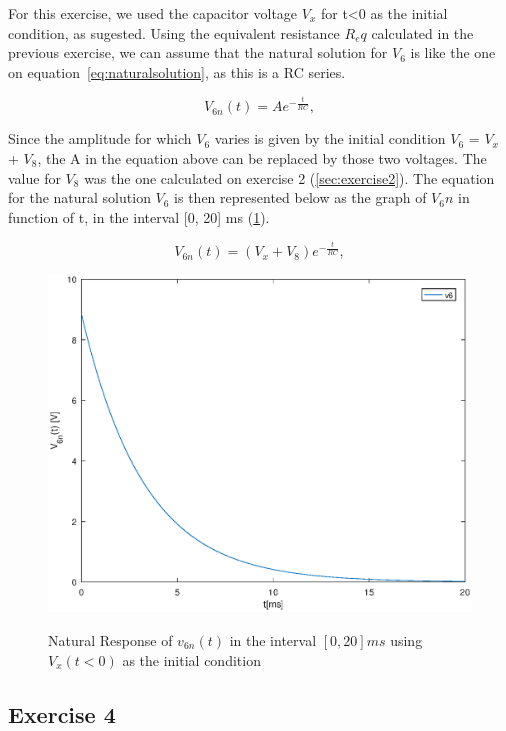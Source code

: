 For this exercise, we used the capacitor voltage $V_x$ for t<0 as the initial condition, as sugested. Using the equivalent resistance $R_eq$ calculated in the previous exercise, we can assume that the natural solution for $V_6$ is like the one on equation~\ref{eq:naturalsolution}, as this is a RC series.

\begin{equation}
  V_{6n}(t) = Ae^{-\frac{t}{RC}},
  \label{eq:naturalsolution}
\end{equation}

Since the amplitude for which $V_6$ varies is given by the initial condition  $V_6$ = $V_x$ + $V_8$, the A in the equation above can be replaced by those two voltages. The value for $V_8$ was the one calculated on exercise 2 (\ref{sec:exercise2}). The equation for the natural solution $V_6$ is then represented below as the graph of $V_6n$ in function of t, in the interval [0, 20] ms (\ref{fig:theoretical_3}). 

\begin{equation}
  V_{6n}(t) = (V_{x} + V_{8})e^{-\frac{t}{RC}},
  \label{eq:naturalsolution2}
\end{equation}


\begin{figure}[!ht] \centering
\caption{Natural Response of $v_{6n}(t)$ in the interval $[0,20]ms$ using $V_x(t<0)$ as the initial condition}
\squeezeup  
\includegraphics[width=0.8\linewidth]{theoretical_3.eps}
\label{fig:theoretical_3}
\end{figure}


\subsection{Exercise 4}
\label{sec:exercise4}


